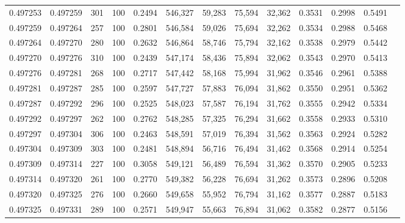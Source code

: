 \begin{tabular}{rrrrrrrrrrrrr}
0.497253 & 0.497259 &   301 & 100 &                                     0.2494 & 546,327 &  59,283 &  75,594 &  32,362 & 0.3531 & 0.2998 & 0.5491 \\
0.497259 & 0.497264 &   257 & 100 &                                     0.2801 & 546,584 &  59,026 &  75,694 &  32,262 & 0.3534 & 0.2988 & 0.5468 \\
0.497264 & 0.497270 &   280 & 100 &                                     0.2632 & 546,864 &  58,746 &  75,794 &  32,162 & 0.3538 & 0.2979 & 0.5442 \\
0.497270 & 0.497276 &   310 & 100 &                                     0.2439 & 547,174 &  58,436 &  75,894 &  32,062 & 0.3543 & 0.2970 & 0.5413 \\
0.497276 & 0.497281 &   268 & 100 &                                     0.2717 & 547,442 &  58,168 &  75,994 &  31,962 & 0.3546 & 0.2961 & 0.5388 \\
0.497281 & 0.497287 &   285 & 100 &                                     0.2597 & 547,727 &  57,883 &  76,094 &  31,862 & 0.3550 & 0.2951 & 0.5362 \\
0.497287 & 0.497292 &   296 & 100 &                                     0.2525 & 548,023 &  57,587 &  76,194 &  31,762 & 0.3555 & 0.2942 & 0.5334 \\
0.497292 & 0.497297 &   262 & 100 &                                     0.2762 & 548,285 &  57,325 &  76,294 &  31,662 & 0.3558 & 0.2933 & 0.5310 \\
0.497297 & 0.497304 &   306 & 100 &                                     0.2463 & 548,591 &  57,019 &  76,394 &  31,562 & 0.3563 & 0.2924 & 0.5282 \\
0.497304 & 0.497309 &   303 & 100 &                                     0.2481 & 548,894 &  56,716 &  76,494 &  31,462 & 0.3568 & 0.2914 & 0.5254 \\
0.497309 & 0.497314 &   227 & 100 &                                     0.3058 & 549,121 &  56,489 &  76,594 &  31,362 & 0.3570 & 0.2905 & 0.5233 \\
0.497314 & 0.497320 &   261 & 100 &                                     0.2770 & 549,382 &  56,228 &  76,694 &  31,262 & 0.3573 & 0.2896 & 0.5208 \\
0.497320 & 0.497325 &   276 & 100 &                                     0.2660 & 549,658 &  55,952 &  76,794 &  31,162 & 0.3577 & 0.2887 & 0.5183 \\
0.497325 & 0.497331 &   289 & 100 &                                     0.2571 & 549,947 &  55,663 &  76,894 &  31,062 & 0.3582 & 0.2877 & 0.5156 \\

\end{tabular}
